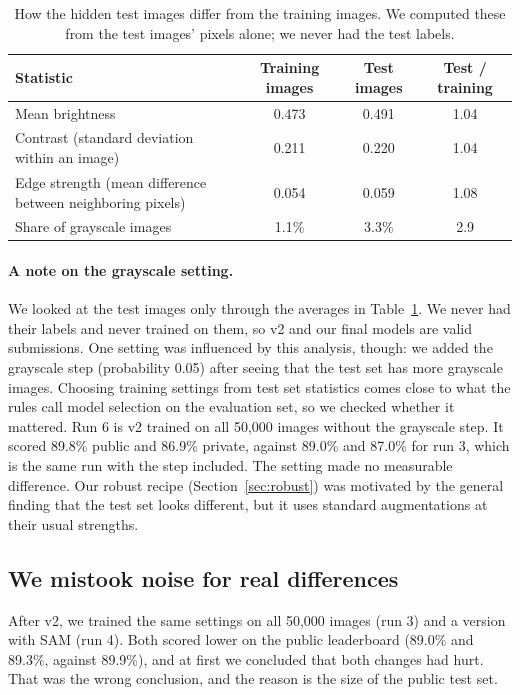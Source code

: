 \documentclass{article}
\begin{document}
\begin{table}[h]
\centering\small
\caption{How the hidden test images differ from the training images. We computed these from the test images' pixels
alone; we never had the test labels.}
\label{tab:shift}
\begin{tabular}{lccc}
\toprule
Statistic & Training images & Test images & Test / training \\
\midrule
Mean brightness & 0.473 & 0.491 & 1.04 \\
Contrast (standard deviation within an image) & 0.211 & 0.220 & 1.04 \\
Edge strength (mean difference between neighboring pixels) & 0.054 & 0.059 & 1.08 \\
Share of grayscale images & 1.1\% & 3.3\% & 2.9 \\
\bottomrule
\end{tabular}
\end{table}

\paragraph{A note on the grayscale setting.} We looked at the test images only through the averages in
Table~\ref{tab:shift}. We never had their labels and never trained on them, so v2 and our final models are valid
submissions. One setting was influenced by this analysis, though: we added the grayscale step (probability 0.05) after
seeing that the test set has more grayscale images. Choosing training settings from test set statistics comes close to
what the rules call model selection on the evaluation set, so we checked whether it mattered. Run 6 is v2 trained on all
50,000 images without the grayscale step. It scored 89.8\% public and 86.9\% private, against 89.0\% and 87.0\% for
run 3, which is the same run with the step included. The setting made no measurable difference. Our robust recipe
(Section~\ref{sec:robust}) was motivated by the general finding that the test set looks different, but it uses standard
augmentations at their usual strengths.

\subsection{We mistook noise for real differences}
\label{sec:noise}
After v2, we trained the same settings on all 50,000 images (run 3) and a version with SAM (run 4). Both scored lower on
the public leaderboard (89.0\% and 89.3\%, against 89.9\%), and at first we concluded that both changes had hurt. That was
the wrong conclusion, and the reason is the size of the public test set.
\end{document}
